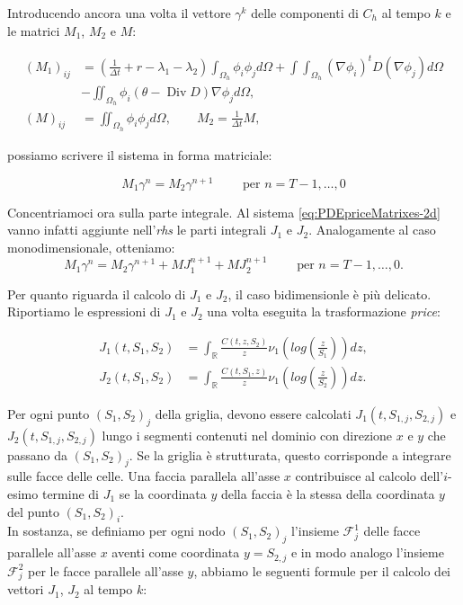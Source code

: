 \documentclass[a4paper,10pt]{report}
\theoremstyle{plain}
\theoremstyle{definition}
\theoremstyle{remark}
\DeclareMathOperator{\Div}{Div}
\begin{document}
Introducendo ancora una volta il vettore $\gamma^k$ delle componenti di $C_h$ al tempo $k$ e le matrici $M_1$, $M_2$ e $M$:

\begin{align*}
 (M_1)_{ij}&=\left(\frac{1}{\Delta t}+r-\lambda_1-\lambda_2\right)\int_{\Omega_h}\phi_i\phi_jd\Omega+\int\int_{\Omega_h}(\nabla\phi_i)^t D (\nabla\phi_j) d\Omega\\&
 -\iint_{\Omega_h}\phi_i(\theta-\Div D)\nabla\phi_j d\Omega,\\
 (M)_{ij}&=\iint_{\Omega_h}\phi_i\phi_j d\Omega, \qquad M_2=\frac{1}{\Delta t}M,
\end{align*}

possiamo scrivere il sistema in forma matriciale:

\begin{equation}
 \label{eq:PDEpriceMatrixes-2d}
 M_1 \gamma^n=M_2\gamma^{n+1} \qquad \text{ per } n=T-1,\dots,0
\end{equation}

Concentriamoci ora sulla parte integrale. Al sistema \eqref{eq:PDEpriceMatrixes-2d} vanno infatti aggiunte nell'\emph{rhs} le parti integrali $J_1$ e $J_2$. Analogamente al caso monodimensionale, otteniamo:
\begin{equation}
 \label{eq:PDEpriceMatrixeswithJ-2d}
 M_1 \gamma^n=M_2\gamma^{n+1}+MJ_1^{n+1}+MJ_2^{n+1}\qquad \text{ per } n=T-1,\dots,0.
\end{equation}

Per quanto riguarda il calcolo di $J_1$ e $J_2$, il caso bidimensionle è più delicato. Riportiamo le espressioni di $J_1$ e $J_2$ una volta eseguita la trasformazione \emph{price}:

\begin{align*}
 J_1(t,S_1,S_2)&= \int_\mathbb{R} \frac{C(t,z,S_2)}{z}\nu_1\left(log\left(\frac{z}{S_1}\right)\right)dz,\\
 J_2(t,S_1,S_2)&= \int_\mathbb{R} \frac{C(t,S_1,z)}{z}\nu_1\left(log\left(\frac{z}{S_2}\right)\right)dz.
\end{align*}

Per ogni punto $(S_1,S_2)_j$ della griglia, devono essere calcolati $J_1(t,S_{1,j},S_{2,j})$ e $J_2(t,S_{1,j},S_{2,j})$ lungo i segmenti contenuti nel dominio con direzione $x$ e $y$ che passano da $(S_1,S_2)_j$. Se la griglia è strutturata, questo corrisponde a integrare sulle facce delle celle. Una faccia parallela all'asse $x$ contribuisce al calcolo dell'$i$-esimo termine di $J_1$ se la coordinata $y$ della faccia è la stessa della coordinata $y$ del punto $(S_1,S_2)_i$.\\
In sostanza, se definiamo per ogni nodo $(S_1,S_2)_j$ l'insieme $\mathcal{F}^1_j$ delle facce parallele all'asse $x$ aventi come coordinata $y=S_{2,j}$ e in modo analogo l'insieme $\mathcal{F}^2_j$ per le facce parallele all'asse $y$, abbiamo le seguenti formule per il calcolo dei vettori $J_1$, $J_2$ al tempo $k$:
\end{document}
